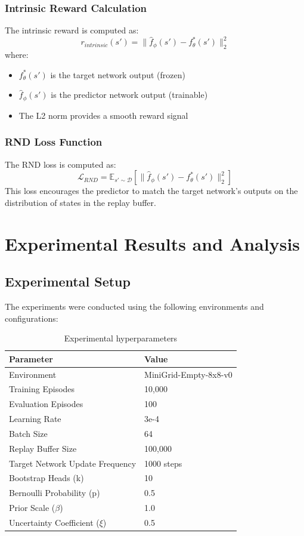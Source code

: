 \documentclass[12pt]{article}
\begin{document}
{{{\subsubsection{Intrinsic Reward Calculation}
The intrinsic reward is computed as:
\begin{equation}
r_{intrinsic}(s') = \|\hat{f}_\phi(s') - f^*_\theta(s')\|_2^2
\end{equation}
where:
\begin{itemize}
    \item $f^*_\theta(s')$ is the target network output (frozen)
    \item $\hat{f}_\phi(s')$ is the predictor network output (trainable)
    \item The L2 norm provides a smooth reward signal
\end{itemize}

\subsubsection{RND Loss Function}
The RND loss is computed as:
\begin{equation}
\mathcal{L}_{RND} = \mathbb{E}_{s' \sim \mathcal{D}} \left[ \|\hat{f}_\phi(s') - f^*_\theta(s')\|_2^2 \right]
\end{equation}
This loss encourages the predictor to match the target network's outputs on the distribution of states in the replay buffer.

\section{Experimental Results and Analysis}

\subsection{Experimental Setup}

The experiments were conducted using the following environments and configurations:

\begin{table}[H]
\centering
\renewcommand{\arraystretch}{1.3}
\begin{tabular}{ll}
\toprule
\textbf{Parameter} & \textbf{Value} \\
\midrule
Environment & MiniGrid-Empty-8x8-v0 \\
Training Episodes & 10,000 \\
Evaluation Episodes & 100 \\
Learning Rate & 3e-4 \\
Batch Size & 64 \\
Replay Buffer Size & 100,000 \\
Target Network Update Frequency & 1000 steps \\
Bootstrap Heads (k) & 10 \\
Bernoulli Probability (p) & 0.5 \\
Prior Scale ($\beta$) & 1.0 \\
Uncertainty Coefficient ($\xi$) & 0.5 \\
\bottomrule
\end{tabular}
\caption{Experimental hyperparameters}
\end{table}

}}}
\end{document}
